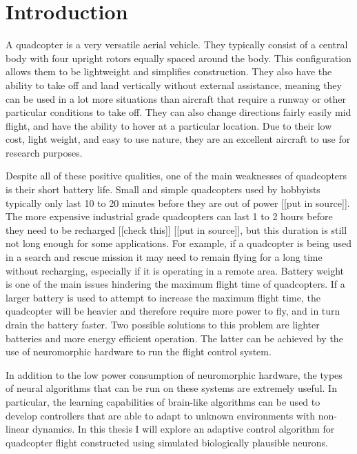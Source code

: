 \documentclass[letterpaper,12pt,titlepage,oneside,final]{book}
\begin{document}
\section{Introduction}


A quadcopter is a very versatile aerial vehicle. 
They typically consist of a central body with four upright rotors equally spaced around the body. 
This configuration allows them to be lightweight and simplifies construction. 
They also have the ability to take off and land vertically without external assistance, meaning they can be used in a lot more situations than aircraft that require a runway or other particular conditions to take off. 
They can also change directions fairly easily mid flight, and have the ability to hover at a particular location. Due to their low cost, light weight, and easy to use nature, they are an excellent aircraft to use for research purposes.

Despite all of these positive qualities, one of the main weaknesses of quadcopters is their short battery life. 
Small and simple quadcopters used by hobbyists typically only last 10 to 20 minutes before they are out of power [[put in source]]. 
The more expensive industrial grade quadcopters can last 1 to 2 hours before they need to be recharged [[check this]] [[put in source]], but this duration is still not long enough for some applications. 
For example, if a quadcopter is being used in a search and rescue mission it may need to remain flying for a long time without recharging, especially if it is operating in a remote area. 
Battery weight is one of the main issues hindering the maximum flight time of quadcopters. If a larger battery is used to attempt to increase the maximum flight time, the quadcopter will be heavier and therefore require more power to fly, and in turn drain the battery faster. 
Two possible solutions to this problem are lighter batteries and more energy efficient operation.
The latter can be achieved by the use of neuromorphic hardware to run the flight control system.

In addition to the low power consumption of neuromorphic hardware, the types of neural algorithms that can be run on these systems are extremely useful. 
In particular, the learning capabilities of brain-like algorithms can be used to develop controllers that are able to adapt to unknown environments with non-linear dynamics. 
In this thesis I will explore an adaptive control algorithm for quadcopter flight constructed using simulated biologically plausible neurons.
\end{document}
